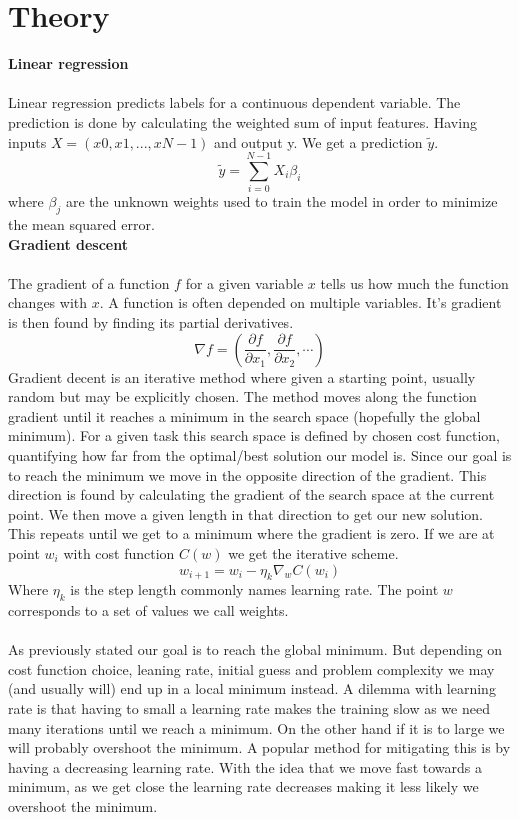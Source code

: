 \documentclass[12pt, letterpaper, twoside]{article}
\begin{document}
\section{Theory}
\textbf{Linear regression}\\
\ \\
Linear regression predicts labels for a continuous dependent variable. The prediction is done by calculating the weighted sum of input features. Having inputs $X = (x0, x1, . . . , x{N-1})$ and output y. We get a prediction $\tilde{y}$.
$$
\tilde{y} = \sum_{i=0}^{N-1} X_i \beta_i
$$
where $\beta_j$ are the unknown weights used to train the model in order to minimize the mean squared error. 
\ \\
\textbf{Gradient descent}\\
\ \\
The gradient of a function $f$ for a given variable $x$ tells us how much the function changes with $x$. A function is often depended on multiple variables. It's gradient is then found by finding its partial derivatives.
$$
\nabla f = \left( \frac{\partial f}{\partial x_1}, \frac{\partial f}{\partial x_2}, \cdots \right)
$$
Gradient decent is an iterative method where given a starting point, usually random but may be explicitly chosen. The method moves along the function gradient until it reaches a minimum in the search space (hopefully  the global minimum). For a given task this search space is defined by chosen cost function, quantifying how far from the optimal/best solution our model is. Since our goal is to reach the minimum we move in the opposite direction of the gradient. This direction is found by calculating the gradient of the search space at the current point. We then move a given length in that direction to get our new solution. This repeats until we get to a minimum where the gradient is zero. If we are at point $w_i$ with cost function $C(w)$ we get the iterative scheme.
$$
w_{i+1} = w_i - \eta_k \nabla_w C(w_i)
$$
Where $\eta_k$ is the step length commonly names learning rate. The point $w$ corresponds to a set of values we call weights.\\
\ \\
As previously stated our goal is to reach the global minimum. But depending on cost function choice, leaning rate, initial guess and problem complexity we may (and usually will) end up in a local minimum instead. A dilemma with learning rate is that having to small a learning rate makes the training slow as we need many iterations until we reach a minimum. On the other hand if it is to large we will probably overshoot the minimum. A popular method for mitigating this is by having a decreasing learning rate. With the idea that we move fast towards a minimum, as we get close the learning rate decreases making it less likely we overshoot the minimum.\\
\end{document}
